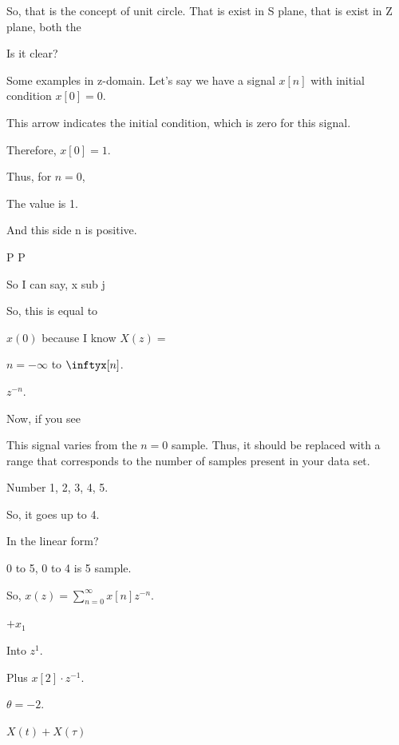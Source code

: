 \documentclass{article}
\begin{document}
So, that is the concept of unit circle. That is exist in S plane, that is exist in Z plane, both the





Is it clear?

Some examples in z-domain. Let's say we have a signal $x[n]$ with initial condition $x[0] = 0$.

This arrow indicates the initial condition, which is zero for this signal.

Therefore, $x[0] = 1$.



Thus, for $n = 0$,

The value is 1.

And this side n is positive.



P P

So I can say, x sub j

So, this is equal to

$x(0)$ because I know $X(z) =$

$n = -\infty$ to $\inftyx[n]$.

$z^{-n}$.

Now, if you see

This signal varies from the $n=0$ sample. Thus, it should be replaced with a range that corresponds to the number of samples present in your data set.

Number 1, 2, 3, 4, 5.

So, it goes up to 4.

In the linear form?

0 to 5, 0 to 4 is 5 sample.

So, $x(z) = \sum_{n=0}^{\infty} x[n]z^{-n}$.

$+ x_1$

Into $z^{1}$.

Plus $x[2] \cdot z^{-1}$.

$\theta = -2$.

$X(t) + X(\tau)$
\end{document}
